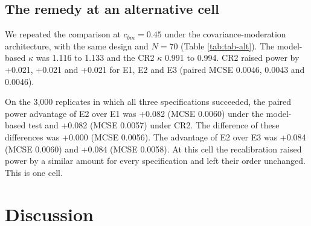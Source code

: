 \documentclass[
  11pt,
]{article}
\begin{document}
\subsection{The remedy at an alternative cell}\label{the-remedy-at-an-alternative-cell}

We repeated the comparison at \(c_{bm} = 0.45\) under the
covariance-moderation architecture, with the same design and \(N = 70\)
(Table \ref{tab:tab-alt}). The model-based \(\kappa\) was
1.116 to
1.133 and the CR2
\(\kappa\) 0.991 to
0.994. CR2 raised
power by +0.021, +0.021 and
+0.021 for E1, E2 and E3 (paired MCSE
0.0046, 0.0043 and
0.0046).

On the 3,000 replicates in which all three
specifications succeeded, the paired power advantage of E2 over E1
was +0.082 (MCSE 0.0060) under the model-based
test and +0.082 (MCSE 0.0057) under CR2. The
difference of these differences was +0.000 (MCSE
0.0056). The advantage of E2 over E3 was +0.084
(MCSE 0.0060) and +0.084 (MCSE 0.0058).
At this cell the recalibration raised power by a similar amount for
every specification and left their order unchanged. This is one cell.

\begin{table}
\centering
\caption{\label{tab:tab-alt}Alternative cell: covariance-moderation architecture, Hybrid, $N = 70$, $c_{bm} = 0.45$, half-life 1 week. Extended DGP ($c_\times = 0.2$, carryover decaying from the last on-drug mean). Power is the rejection rate of M3 with the fitted mean.}
\centering
{}
\end{table}

\section{Discussion}\label{discussion}
\end{document}
